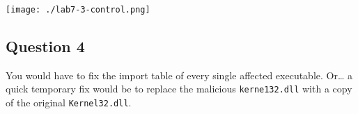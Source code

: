 \documentclass[11pt]{article}
\begin{document}
\begin{center}
\texttt{[image: ./lab7-3-control.png]}
\end{center}
\subsection{Question 4}
\label{sec:org3eecc59}
You would have to fix the import table of every single affected
executable. Or\ldots{} a quick temporary fix would be to replace the
malicious \texttt{kerne132.dll} with a copy of the original \texttt{Kernel32.dll}.
\end{document}
